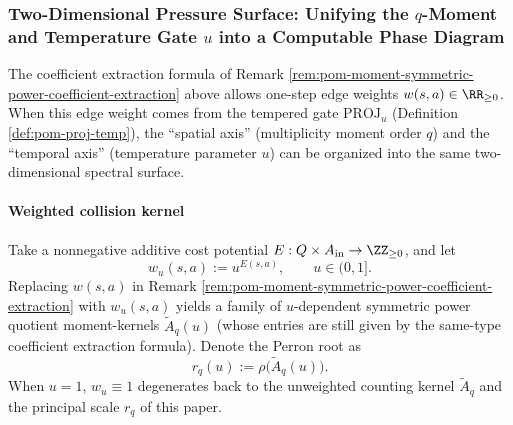\subsubsection{Two-Dimensional Pressure Surface: Unifying the \texorpdfstring{$q$}{q}-Moment and Temperature Gate \texorpdfstring{$u$}{u} into a Computable Phase Diagram}\label{subsec:pom-pressure-surface-qu}

The coefficient extraction formula of Remark \ref{rem:pom-moment-symmetric-power-coefficient-extraction} above allows one-step edge weights
\(
w(s,a)\in\RR_{\ge 0}
\).
When this edge weight comes from the tempered gate \(\mathrm{PROJ}_u\) (Definition \ref{def:pom-proj-temp}), the ``spatial axis'' (multiplicity moment order \(q\)) and the ``temporal axis'' (temperature parameter \(u\)) can be organized into the same two-dimensional spectral surface.

\paragraph{Weighted collision kernel}
Take a nonnegative additive cost potential \(E:Q\times A_{\mathrm{in}}\to\ZZ_{\ge 0}\), and let
\[
w_u(s,a):=u^{E(s,a)},\qquad u\in(0,1].
\]
Replacing \(w(s,a)\) in Remark \ref{rem:pom-moment-symmetric-power-coefficient-extraction} with \(w_u(s,a)\) yields a family of \(u\)-dependent symmetric power quotient moment-kernels
\(
\widetilde A_q(u)
\)
(whose entries are still given by the same-type coefficient extraction formula).
Denote the Perron root as
\[
r_q(u):=\rho\!\bigl(\widetilde A_q(u)\bigr).
\]
When \(u=1\), \(w_u\equiv 1\) degenerates back to the unweighted counting kernel \(\widetilde A_q\) and the principal scale \(r_q\) of this paper.

